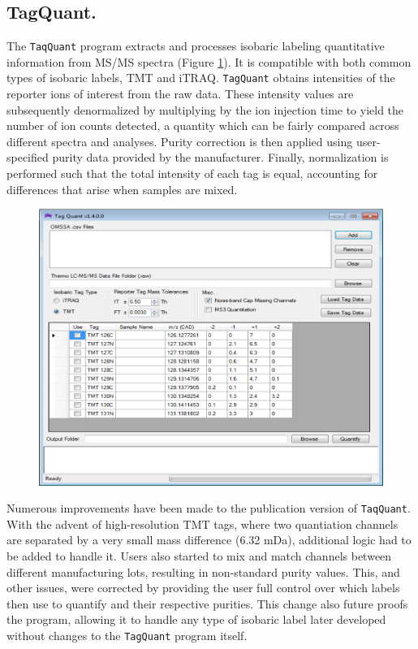 \subsection*{TagQuant.}
The \texttt{TaqQuant} program extracts and processes isobaric labeling quantitative information from MS/MS spectra (Figure \ref{fig:tagquant}). It is compatible with both common types of isobaric labels, TMT and iTRAQ.\cite{tmt,itraq} \texttt{TagQuant} obtains intensities of the reporter ions of interest from the raw data. These intensity values are subsequently denormalized by multiplying by the ion injection time to yield the number of ion counts detected, a quantity which can be fairly compared across different spectra and analyses. Purity correction is then applied using user-specified purity data provided by the manufacturer.\cite{itracker} Finally, normalization is performed such that the total intensity of each tag is equal, accounting for differences that arise when samples are mixed.
\begin{figure}[p]
	\centering
	\includegraphics[width=\columnwidth]{csmsl/tagquant.png}
	\label{fig:tagquant}
\end{figure}

Numerous improvements have been made to the publication version of \texttt{TaqQuant}. With the advent of high-resolution TMT tags, where two quantiation channels are separated by a very small mass difference (6.32 mDa), additional logic had to be added to handle it.\cite{tmt8,tmt82} Users also started to mix and match channels between different manufacturing lots, resulting in non-standard purity values. This, and other issues, were corrected by providing the user full control over which labels then use to quantify and their respective purities. This change also future proofs the program, allowing it to handle any type of isobaric label later developed without changes to the \texttt{TagQuant} program itself.

